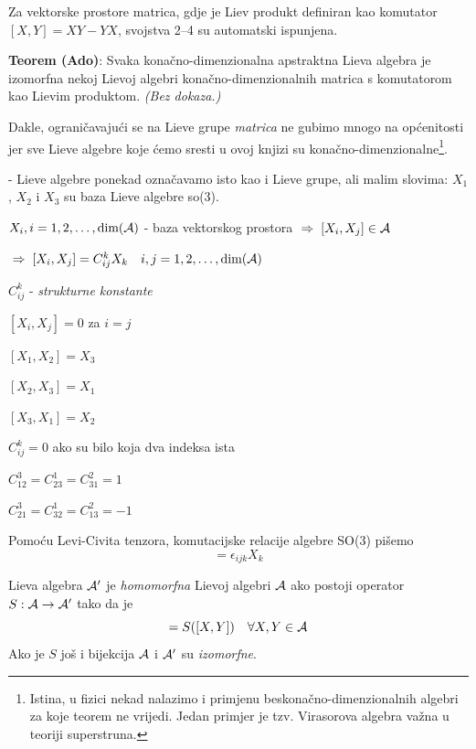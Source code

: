 
Za vektorske prostore matrica, gdje je Liev produkt definiran kao
komutator $[X,Y]=XY-YX$, svojstva 2--4 su automatski ispunjena.

\textbf{Teorem (Ado)}: Svaka konačno-dimenzionalna apstraktna Lieva algebra je izomorfna nekoj
 Lievoj algebri konačno-dimenzionalnih matrica s komutatorom kao Lievim produktom. \emph{(Bez
dokaza.)}

Dakle, ograničavajući se na Lieve grupe \emph{matrica} ne gubimo mnogo
na općenitosti jer sve Lieve algebre koje ćemo sresti u ovoj knjizi su
konačno-dimenzionalne\footnote{Istina, u fizici nekad nalazimo i primjenu beskonačno-dimenzionalnih
algebri za koje teorem ne vrijedi. Jedan primjer je tzv. Virasorova algebra važna
u teoriji superstruna.}.

- Lieve algebre ponekad označavamo isto kao i Lieve grupe, ali malim slovima:
  $X_1$, $X_2$ i $X_3$ su baza Lieve algebre so(3).

$X_i, i=1,2,\ldots, \textrm{dim}(\mathcal{A})$ - baza vektorskog prostora 
  $\;\Rightarrow\; [X_i, X_j]\in\mathcal{A}$

$\;\Rightarrow\; [X_i, X_j]=C_{ij}^{k}X_k  \quad i,j=1,2,\ldots, \textrm{dim}(\mathcal{A})$

$C_{ij}^{k}$ - \emph{strukturne konstante}

\begin{primjer}
$[X_i,X_j]=0$ za $i=j$ 

$[X_1,X_2] = X_3$


$[X_2, X_3]=X_1$ 

$[X_3,X_1]=X_2$

$C_{ij}^{k}=0$ ako su bilo koja dva indeksa ista

$C_{12}^3=C_{23}^{1}=C_{31}^{2}=1$

$C_{21}^3=C_{32}^{1}=C_{13}^{2}=-1$

\end{primjer}


Pomoću Levi-Civita tenzora, komutacijske relacije algebre SO(3) pišemo
\begin{displaymath}
 [X_i, X_j]=\epsilon_{ijk} X_k  
\end{displaymath}

Lieva algebra $\mathcal{A}'$ je \emph{homomorfna} Lievoj algebri $\mathcal{A}$ ako postoji 
operator $S:\mathcal{A}\to\mathcal{A}'$ tako da je
\begin{displaymath}
       [S(X), S(Y)]=S([X,Y]) \quad \forall X, Y \in\calA
\end{displaymath}
Ako je $S$ još i bijekcija $\mathcal{A}$ i $\mathcal{A}'$ su \emph{izomorfne}.

